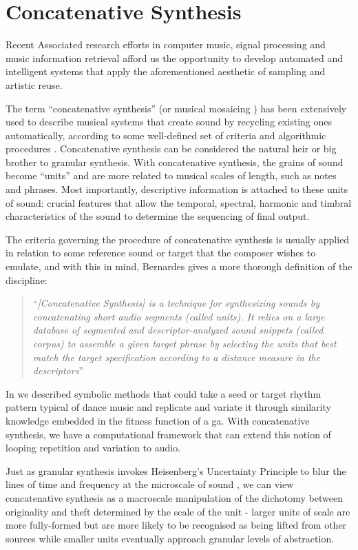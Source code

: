 \section{Concatenative Synthesis}

Recent Associated research efforts in computer music, signal processing and music information retrieval afford us the opportunity to develop automated and intelligent systems that apply the aforementioned aesthetic of sampling and artistic reuse. 

The term ``concatenative synthesis'' (or musical mosaicing \citep{Zils2001}) has been extensively used to describe musical systems that create sound by recycling existing ones automatically, according to some well-defined set of criteria and algorithmic procedures \citep{Schwarz2000}. Concatenative synthesis can be considered the natural heir or big brother to granular synthesis. With concatenative synthesis, the grains of sound become “units” and are more related to musical scales of length, such as notes and phrases. Most importantly, descriptive information is attached to these units of sound: crucial features that allow the temporal, spectral, harmonic and timbral characteristics of the sound to determine the sequencing of final output. 

The criteria governing the procedure of concatenative synthesis is usually applied in relation to some reference sound or target that the composer wishes to emulate, and with this in mind, Bernardes gives a more thorough definition of the discipline:

\blockcquote[]{Bernardes2013}{``\textit{[Concatenative Synthesis] is a technique for synthesizing sounds by concatenating short audio segments (called units). It relies on a large database of segmented and descriptor-analyzed sound snippets (called corpus) to assemble a given target phrase by selecting the units that best match the target specification according to a distance measure in the descriptors}''}

In  we described symbolic methods that could take a seed or target rhythm pattern typical of dance music and replicate and variate it through similarity knowledge embedded in the fitness function of a \acrshort{ga}. With concatenative synthesis, we have a computational framework that can extend this notion of looping repetition and variation to audio. 

Just as granular synthesis invokes Heisenberg's Uncertainty Principle to blur the lines of time and frequency at the microscale of sound \citep{Truax2005}, we can view concatenative synthesis as a macroscale manipulation of the dichotomy between originality and theft determined by the scale of the unit - larger units of scale are more fully-formed but are more likely to be recognised as being lifted from other sources while smaller units eventually approach granular levels of abstraction.
